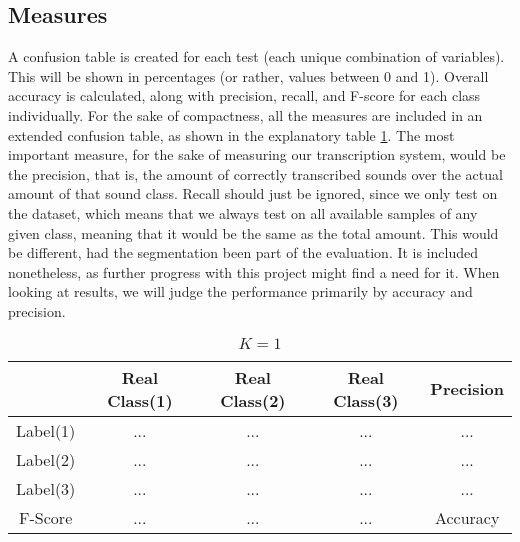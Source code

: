 	\subsection{Measures}
		A confusion table is created for each test (each unique combination of variables). This will be shown in percentages (or rather, values between 0 and 1). Overall accuracy is calculated, along with precision, recall, and F-score for each class individually. For the sake of compactness, all the measures are included in an extended confusion table, as shown in the explanatory table \ref{table:eval:explanatory}. 
		The most important measure, for the sake of measuring our transcription system, would be the precision, that is, the amount of correctly transcribed sounds over the actual amount of that sound class.
		Recall should just be ignored, since we only test on the dataset, which means that we always test on all available samples of any given class, meaning that it would be the same as the total amount. This would be different, had the segmentation been part of the evaluation. It is included nonetheless, as further progress with this project might find a need for it. When looking at results, we will judge the performance primarily by accuracy and precision.

			\begin{table}
				\centering
				\begin{tabular}{|c | c | c | c | c |}
					\hline
				 & Real Class(1) & Real Class(2) & Real Class(3) & Precision\\ \hline
					Label(1)  & ... & ... & ... & ...\\ \hline
					Label(2)  & ... & ... & ... & ...\\ \hline
					Label(3) & ... & ... & ... & ...\\ \hline
					F-Score & ... & ... & ... & Accuracy \\ \cline{1-4}
				\end{tabular}
				\caption{$K=1$}
				\label{table:eval:explanatory}
			\end{table}
		
		
